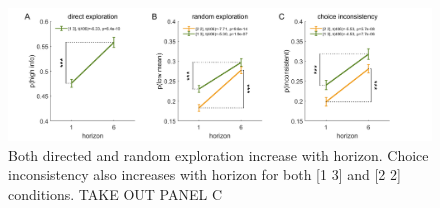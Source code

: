 \documentclass[12pt]{article}
\begin{document}
	
	
	
	
	\begin{figure}[H]
		\begin{center}
			\includegraphics[width=\textwidth]{figures/modelfree.png}
			\caption{Both directed and random exploration increase with horizon. Choice inconsistency also increases with horizon for both [1 3] and [2 2] conditions. TAKE OUT PANEL C }
			\label{fig:modelfree}
		\end{center}
	\end{figure}
	
	
\end{document}
